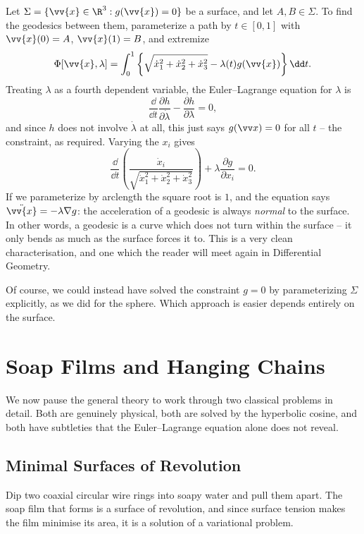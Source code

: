 \documentclass[a4paper]{scrartcl}
\begin{document}
\begin{example}
	Let $\Sigma = \{\vv{x} \in \R^3 : g(\vv{x}) = 0\}$ be a surface, and let $A, B \in \Sigma$. To find the geodesics between them, parameterize a path by $t \in [0,1]$ with $\vv{x}(0) = A$, $\vv{x}(1) = B$, and extremize
	$$
	\Phi[\vv{x}, \lambda] = \int_0^1\left\{\sqrt{\dot x_1^2 + \dot x_2^2 + \dot x_3^2} - \lambda(t)g(\vv{x})\right\}\dd t.
	$$
	Treating $\lambda$ as a fourth dependent variable, the Euler--Lagrange equation for $\lambda$ is
	$$
	\frac{\dd}{\dd t}\frac{\partial h}{\partial \dot\lambda} - \frac{\partial h}{\partial \lambda} = 0,
	$$
	and since $h$ does not involve $\dot \lambda$ at all, this just says $g(\vv x) = 0$ for all $t$ -- the constraint, as required. Varying the $x_i$ gives
	$$
	\frac{\dd}{\dd t}\left(\frac{\dot x_i}{\sqrt{\dot x_1^2 + \dot x_2^2 + \dot x_3^2}}\right) + \lambda \frac{\partial g}{\partial x_i} = 0.
	$$
	If we parameterize by arclength the square root is $1$, and the equation says $\ddot{\vv{x}} = -\lambda \nabla g$: the acceleration of a geodesic is always \emph{normal} to the surface. In other words, a geodesic is a curve which does not turn within the surface -- it only bends as much as the surface forces it to. This is a very clean characterisation, and one which the reader will meet again in Differential Geometry.

	Of course, we could instead have solved the constraint $g = 0$ by parameterizing $\Sigma$ explicitly, as we did for the sphere. Which approach is easier depends entirely on the surface.
\end{example}

\section{Soap Films and Hanging Chains}

We now pause the general theory to work through two classical problems in detail. Both are genuinely physical, both are solved by the hyperbolic cosine, and both have subtleties that the Euler--Lagrange equation alone does not reveal.

\subsection{Minimal Surfaces of Revolution}\label{sec:soap}

Dip two coaxial circular wire rings into soapy water and pull them apart. The soap film that forms is a surface of revolution, and since surface tension makes the film minimise its area, it is a solution of a variational problem.
\end{document}
